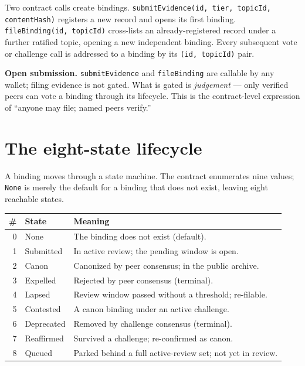 \documentclass[11pt,a4paper]{article}
\begin{document}
Two contract calls create bindings. \texttt{submitEvidence(id, tier,
topicId, contentHash)} registers a new record and opens its first binding.
\texttt{fileBinding(id, topicId)} cross-lists an already-registered record
under a further ratified topic, opening a new independent binding. Every
subsequent vote or challenge call is addressed to a binding by its
\texttt{(id, topicId)} pair.

\begin{notebox}
\textbf{Open submission.} \texttt{submitEvidence} and \texttt{fileBinding}
are callable by any wallet; filing evidence is not gated. What is gated is
\emph{judgement} --- only verified peers can vote a binding through its
lifecycle. This is the contract-level expression of ``anyone may file; named
peers verify.''
\end{notebox}

\section{The eight-state lifecycle}

A binding moves through a state machine. The contract enumerates nine
values; \texttt{None} is merely the default for a binding that does not
exist, leaving eight reachable states.

\begin{center}
\begin{tabular}{@{}rll@{}}
\toprule
\# & \textbf{State} & \textbf{Meaning} \\
\midrule
0 & None       & The binding does not exist (default). \\
1 & Submitted  & In active review; the pending window is open. \\
2 & Canon      & Canonized by peer consensus; in the public archive. \\
3 & Expelled   & Rejected by peer consensus (terminal). \\
4 & Lapsed     & Review window passed without a threshold; re-filable. \\
5 & Contested  & A canon binding under an active challenge. \\
6 & Deprecated & Removed by challenge consensus (terminal). \\
7 & Reaffirmed & Survived a challenge; re-confirmed as canon. \\
8 & Queued     & Parked behind a full active-review set; not yet in review. \\
\bottomrule
\end{tabular}
\end{center}
\end{document}
